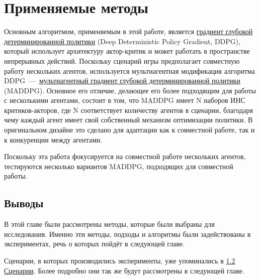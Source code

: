 \chapter{Применяемые методы} \label{ch3}

Основным алгоритмом, применяемым в этой работе, является \hyperref[acr:ddpg]{градиент глубокой детерминированной политики} (Deep Deterministic Policy Gradient, DDPG), который использует архитектуру актор-критик и может работать в пространстве непрерывных действий. Поскольку сценарий игры предполагает совместную работу нескольких агентов, используется мультиагентная модификация алгоритма DDPG~---~\hyperref[acr:maddpg]{мультиагентный градиент глубокой детерминированной политики} (MADDPG). Основное его отличие, делающее его более подходящим для работы с несколькими агентами, состоит в том, что MADDPG имеет N наборов ИНС критиков-акторов, где N соответствует количеству агентов в сценарии, благодаря чему каждый агент имеет свой собственный механизм оптимизации политики. В оригинальном дизайне \cite{lowe2017multiagent} это сделано для адаптации как к совместной работе, так и к конкуренции между агентами.

Поскольку эта работа фокусируется на совместной работе нескольких агентов, тестируются несколько вариантов MADDPG, подходящих для совместной работы.





\section{Выводы}

В этой главе были рассмотрены методы, которые были выбраны для исследования. Именно эти методы, подходы и алгоритмы были задействованы в экспериментах, речь о которых пойдёт в следующей главе. 

Сценарии, в которых производились эксперименты, уже упоминались в \hyperref[intro:sec2]{1.2 Сценарии}. Более подробно они так же будут рассмотрены в следующей главе.

\newpage
